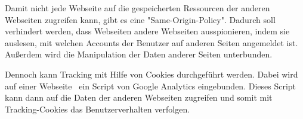  \label{sec:sameorigin}

Damit nicht jede Webseite auf die gespeicherten Ressourcen der anderen Webseiten zugreifen kann, gibt es eine "Same-Origin-Policy".
Dadurch soll verhindert werden, dass Webseiten andere Webseiten ausspionieren, indem sie auslesen, mit welchen Accounts der Benutzer auf anderen Seiten angemeldet ist. Außerdem wird die Manipulation der Daten anderer Seiten unterbunden. \cite{MDNSame-origin-policy}

Dennoch kann Tracking mit Hilfe von Cookies durchgeführt werden.
Dabei wird auf einer Webseite \zb\ ein Script von Google Analytics eingebunden. 
Dieses Script kann dann auf die Daten der anderen Webseiten zugreifen und somit mit Tracking-Cookies das Benutzer\-verhalten verfolgen. \cite{TrackingCookies}







\clearpage

\clearpage

